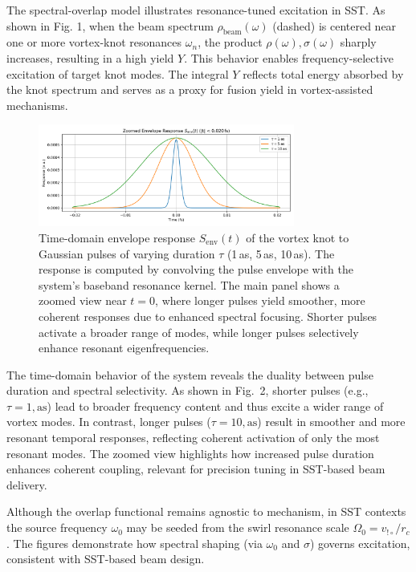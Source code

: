 \documentclass[aip,jap,preprint,amsmath,amssymb]{revtex4-2} %
\begin{document}
    The spectral-overlap model illustrates resonance-tuned excitation in SST. As shown in Fig. 1, when the beam spectrum $\rho_{\mathrm{beam}}(\omega)$ (dashed) is centered near one or more vortex-knot resonances $\omega_n$, the product $\rho(\omega),\sigma(\omega)$ sharply increases, resulting in a high yield $Y$. This behavior enables frequency-selective excitation of target knot modes. The integral $Y$ reflects total energy absorbed by the knot spectrum and serves as a proxy for fusion yield in vortex-assisted mechanisms.

    \begin{figure}[h!]
        \centering
        \includegraphics[width=0.75\textwidth]{sst_time_response_env_zoom}
        \caption{Time-domain envelope response $S_{\mathrm{env}}(t)$ of the vortex knot to Gaussian pulses of varying duration $\tau$ (1\,as, 5\,as, 10\,as). The response is computed by convolving the pulse envelope with the system’s baseband resonance kernel.
        The main panel shows a zoomed view near $t=0$, where longer pulses yield smoother, more coherent responses due to enhanced spectral focusing.
        Shorter pulses activate a broader range of modes, while longer pulses selectively enhance resonant eigenfrequencies.
        }
    \end{figure}


    The time-domain behavior of the system reveals the duality between pulse duration and spectral selectivity. As shown in Fig.~2, shorter pulses (e.g., $\tau = 1,\mathrm{as}$) lead to broader frequency content and thus excite a wider range of vortex modes. In contrast, longer pulses ($\tau = 10,\mathrm{as}$) result in smoother and more resonant temporal responses, reflecting coherent activation of only the most resonant modes. The zoomed view highlights how increased pulse duration enhances coherent coupling, relevant for precision tuning in SST-based beam delivery.


    Although the overlap functional remains agnostic to mechanism, in SST contexts the source frequency $\omega_0$ may be seeded from the swirl resonance scale $\Omega_0 = v_{!\circ} / r_c$. The figures demonstrate how spectral shaping (via $\omega_0$ and $\sigma$) governs excitation, consistent with SST-based beam design.
\end{document}
